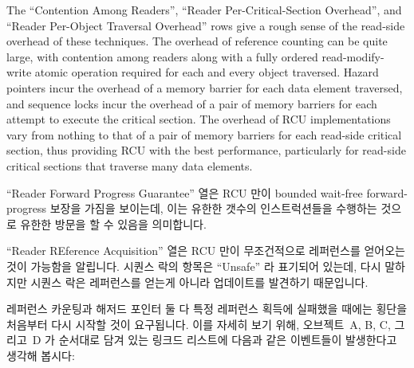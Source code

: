 The ``Contention Among Readers'', ``Reader Per-Critical-Section Overhead'',
and ``Reader Per-Object Traversal Overhead'' rows give a rough sense of
the read-side overhead of these techniques.
The overhead of reference counting can be quite large, with
contention among readers along with a fully ordered read-modify-write
atomic operation required for each and every object traversed.
Hazard pointers incur the overhead of a memory barrier for each data element
traversed, and sequence locks incur the overhead of a pair of memory barriers
for each attempt to execute the critical section.
The overhead of RCU implementations vary from nothing to that of a pair of
memory barriers for each read-side critical section, thus providing RCU
with the best performance, particularly for read-side critical sections
that traverse many data elements.
\fi

``Reader Forward Progress Guarantee'' 열은 RCU 만이 bounded wait-free
forward-progress 보장을 가짐을 보이는데, 이는 유한한 갯수의 인스트럭션들을
수행하는 것으로 유한한 방문을 할 수 있음을 의미합니다.

``Reader REference Acquisition'' 열은 RCU 만이 무조건적으로 레퍼런스를 얻어오는
것이 가능함을 알립니다.
시퀀스 락의 항목은 ``Unsafe'' 라 표기되어 있는데, 다시 말하지만 시퀀스 락은
레퍼런스를 얻는게 아니라 업데이트를 발견하기 때문입니다.
\iffalse

The ``Reader Forward Progress Guarantee'' row shows that only RCU
has a bounded wait-free forward-progress guarantee, which means that
it can carry out a finite traversal by executing a bounded number of
instructions.

The ``Reader Reference Acquisition'' rows indicates that only RCU is
capable of unconditionally acquiring references.
The entry for sequence locks is ``Unsafe'' because, again, sequence locks
detect updates rather than acquiring references.
\fi

레퍼런스 카운팅과 해저드 포인터 둘 다 특정 레퍼런스 획득에 실패했을 때에는
횡단을 처음부터 다시 시작할 것이 요구됩니다.
이를 자세히 보기 위해, 오브젝트~A, B, C, 그리고~D 가 순서대로 담겨 있는 링크드
리스트에 다음과 같은 이벤트들이 발생한다고 생각해 봅시다:
\iffalse

Reference counting and hazard pointers both require that traversals be
restarted from the beginning if a given acquisition fails.
To see this, consider a linked list containing objects~A, B, C, and~D,
in that order, and the following series of events:
\fi


